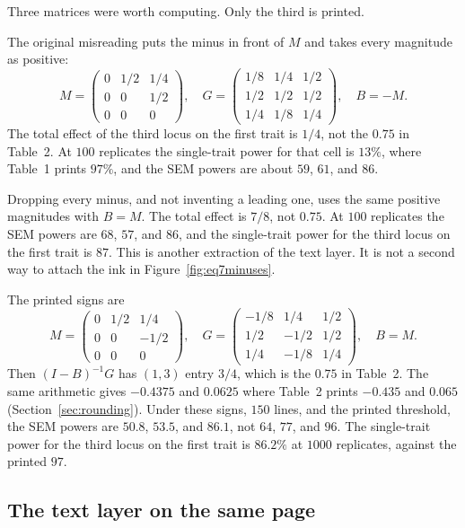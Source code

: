 \documentclass[11pt]{article}
\begin{document}
Three matrices were worth computing. Only the third is printed.

The original misreading puts the minus in front of $M$ and takes every
magnitude as positive:
\[
M=\begin{pmatrix}0&1/2&1/4\\0&0&1/2\\0&0&0\end{pmatrix},\quad
G=\begin{pmatrix}1/8&1/4&1/2\\1/2&1/2&1/2\\1/4&1/8&1/4\end{pmatrix},\quad
B=-M.
\]
The total effect of the third locus on the first trait is $1/4$, not the
$0.75$ in Table~2. At $100$ replicates the single-trait power for that cell
is $13\%$, where Table~1 prints $97\%$, and the SEM powers are about $59$,
$61$, and $86$.

Dropping every minus, and not inventing a leading one, uses the same
positive magnitudes with $B=M$. The total effect is $7/8$, not $0.75$.
At $100$ replicates the SEM powers are $68$, $57$, and $86$, and the
single-trait power for the third locus on the first trait is $87$. This is
another extraction of the text layer. It is not a second way to attach the
ink in Figure~\ref{fig:eq7minuses}.

The printed signs are
\[
M=\begin{pmatrix}0&1/2&1/4\\0&0&-1/2\\0&0&0\end{pmatrix},\quad
G=\begin{pmatrix}-1/8&1/4&1/2\\1/2&-1/2&1/2\\1/4&-1/8&1/4\end{pmatrix},\quad
B=M.
\]
Then $(I-B)^{-1}G$ has $(1,3)$ entry $3/4$, which is the $0.75$ in Table~2.
The same arithmetic gives $-0.4375$ and $0.0625$ where Table~2 prints
$-0.435$ and $0.065$ (Section~\ref{sec:rounding}). Under these signs, $150$
lines, and the printed threshold, the SEM powers are $50.8$, $53.5$, and
$86.1$, not $64$, $77$, and $96$. The single-trait power for the third
locus on the first trait is $86.2\%$ at $1000$ replicates, against the
printed $97$.

\subsection{The text layer on the same page}
\label{sec:textlayer}
\end{document}
